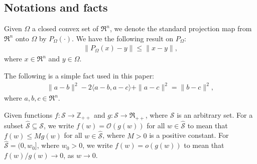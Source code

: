 \documentclass[11pt]{article}
\begin{document}
\subsection{Notations and facts}\label{subsec:notationsfacts}

Given $\Omega$ a closed convex set of $\Re^n$, we denote the standard projection map from $\Re^n$ onto $\Omega$ by $P_\Omega(\cdot)$.  We have the following result on $P_{\Omega}$:
\begin{eqnarray}\label{ineq:projection}
\| P_\Omega(x) - y \| \leq \| x - y \|,
\end{eqnarray}
where $x \in \Re^n$ and $y \in \Omega$.

\vspace{10pt}

\noindent The following is a simple fact used in this paper:
\begin{eqnarray}\label{eq:triangle}
\| a - b \|^2 - 2 \langle a - b, a - c \rangle + \| a - c \|^2 = \| b - c \|^2,
\end{eqnarray} 
where $a, b, c \in \Re^n$.

\vspace{10pt}

\noindent Given functions $f: \mathcal{S} \rightarrow \mathbb{Z}_{++}$ and $g: \mathcal{S} \rightarrow \Re_{++}$, where $\mathcal{S}$ is an arbitrary set. For a subset $\hat{\mathcal{S}} \subseteq \mathcal{S}$, we write $f(w) = \mathcal{O}(g(w))$ for all $w \in \hat{\mathcal{S}}$ to mean that $f(w) \leq M g(w)$ for all $w \in \hat{\mathcal{S}}$, where $M > 0$ is a positive constant.  For $\hat{\mathcal{S}} = (0, w_0]$, where $w_0 > 0$, we write $f(w) = o(g(w))$ to mean that $f(w)/g(w) \rightarrow 0$, as $w \rightarrow 0$.


%
\end{document}
